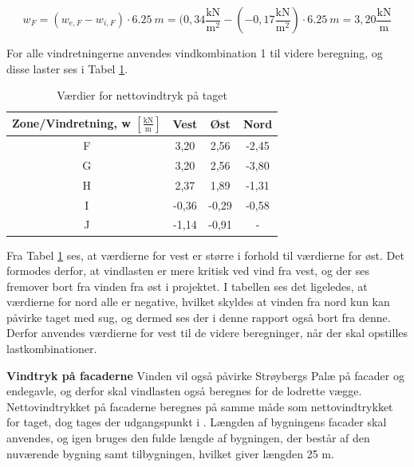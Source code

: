 \begin{equation} 
	w_F = (w_{e,F}-w_{i,F})\cdot \SI{6,25}{m} = (0,\!34 \frac{\text{kN}}{\text{m}^2} - (-0,\!17 \frac{\text{kN}}{\text{m}^2})\cdot \SI{6,25}{m} = 3,\!20 \frac{\text{kN}}{\text{m}}
\end{equation}

For alle vindretningerne anvendes vindkombination 1 til videre beregning, og disse laster ses i Tabel \ref{tab:bb}. 

\begin{table}[htb]
	\begin{center}
		\begin{tabular}{ c c c c } 
			\hline
			Zone/Vindretning, w $[\frac{\text{kN}}{\text{m}}]$ & Vest & Øst & Nord \\	\hline
			F & 3,20 & 2,56 & -2,45 \\
			G & 3,20 & 2,56 & -3,80 \\	
			H & 2,37 & 1,89 & -1,31 \\ 	
			I & -0,36 & -0,29 & -0,58 \\
			J & -1,14 & -0,91 & - \\
		\end{tabular}
		\caption{Værdier for nettovindtryk på taget}
		\label{tab:bb}
	\end{center}
\end{table}

Fra Tabel \ref{tab:bb} ses, at værdierne for vest er større i forhold til værdierne for øst. Det formodes derfor, at vindlasten er mere kritisk ved vind fra vest, og der ses fremover bort fra vinden fra øst i projektet. I tabellen ses det ligeledes, at værdierne for nord alle er negative, hvilket skyldes at vinden fra nord kun kan påvirke taget med sug, og dermed ses der i denne rapport også bort fra denne. 
\newline \indent{     }  Derfor anvendes værdierne for vest til de videre beregninger, når der skal opstilles lastkombinationer.


\textbf{Vindtryk på facaderne}
\newline
Vinden vil også påvirke Strøybergs Palæ på facader og endegavle, og derfor skal vindlasten også beregnes for de lodrette vægge.
\newline \indent{     }  Nettovindtrykket på facaderne beregnes på samme måde som nettovindtrykket for taget, dog tages der udgangspunkt i \citep[ tabel 7.1]{EU91}. Længden af bygningens facader skal anvendes, og igen bruges den fulde længde af bygningen, der består af den nuværende bygning samt tilbygningen, hvilket giver længden 25 m. 


